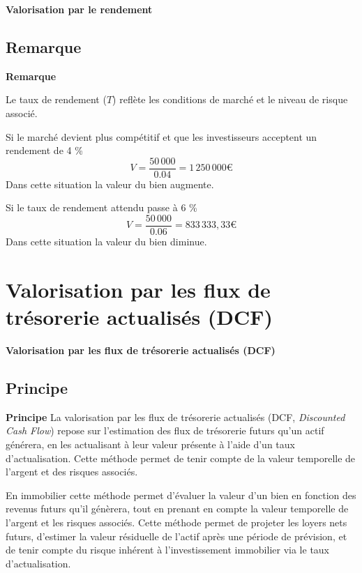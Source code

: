 \documentclass{beamer}
\begin{document}
\begin{frame}{\textbf{Valorisation par le rendement}}
\subsection{Remarque}
\begin{block}{\textbf{Remarque}}

Le taux de rendement (\( T \)) reflète les conditions de marché et le niveau de risque associé. 
\end{block}

\begin{block}

Si le marché devient plus compétitif et que les investisseurs acceptent un rendement de 4 \%
\[ V = \frac{50\,000}{0.04}= 1\,250\,000\text{€} \]
Dans cette situation la valeur du bien augmente.

\end{block}
\begin{block}
	
	Si le taux de rendement attendu passe à 6 \%
	\[ V = \frac{50\,000}{0.06}= 833\,333,33\text{€} \]
	Dans cette situation la valeur du bien diminue.
	
\end{block}

\end{frame}
\section{Valorisation par les flux de trésorerie actualisés (DCF)}
\begin{frame}{\textbf{Valorisation par les flux de trésorerie actualisés (DCF)}}
	
\subsection{Principe}	
	\begin{block}{\textbf{Principe}}		
La valorisation par les flux de trésorerie actualisés (DCF, \textit{Discounted Cash Flow}) repose sur l’estimation des flux de trésorerie futurs qu’un actif générera, en les actualisant à leur valeur présente à l’aide d’un taux d’actualisation. Cette méthode permet de tenir compte de la valeur temporelle de l’argent et des risques associés.
	\end{block}
	
\begin{block}

En immobilier cette méthode permet d’évaluer la valeur d’un bien en fonction des revenus futurs qu’il génèrera, tout en prenant en compte la valeur temporelle de l’argent et les risques associés. Cette méthode permet de projeter les loyers nets futurs, d’estimer la valeur résiduelle de l’actif après une période de prévision, et de tenir compte du risque inhérent à l’investissement immobilier via le taux d’actualisation.
\end{block}
	
\end{frame}
\end{document}
